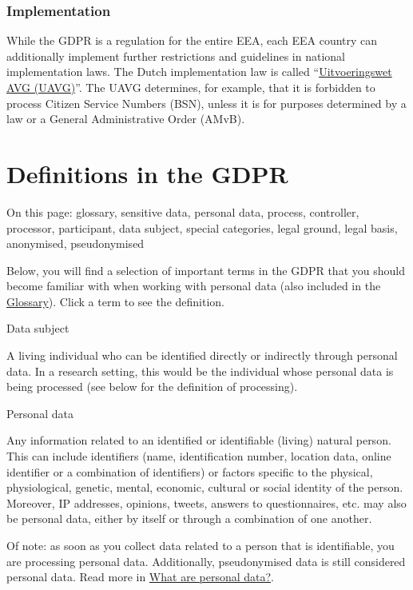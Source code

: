 \documentclass[
]{book}
\begin{document}
\hypertarget{implementation}{%
\subsubsection{Implementation}\label{implementation}}

While the GDPR is a regulation for the entire EEA, each EEA country can additionally
implement further restrictions and guidelines in national implementation laws. The
Dutch implementation law is called
``\href{https://wetten.overheid.nl/BWBR0040940/2021-07-01\%22}{Uitvoeringswet AVG (UAVG)}''.
The UAVG determines, for example, that it is forbidden to process Citizen
Service Numbers (BSN), unless it is for purposes determined by a law or a
General Administrative Order (AMvB).

\hypertarget{definitions}{%
\section{Definitions in the GDPR}\label{definitions}}

On this page: glossary, sensitive data, personal data, process, controller,
processor, participant, data subject, special categories, legal ground, legal
basis, anonymised, pseudonymised

Below, you will find a selection of important terms in the GDPR that you should
become familiar with when working with personal data (also included in the
\protect\hyperlink{glossary}{Glossary}). Click a term to see the definition.

Data subject

A living individual who can be identified directly or indirectly through
personal data. In a research setting, this would be the individual whose
personal data is being processed (see below for the definition of processing).

Personal data

Any information related to an identified or identifiable (living) natural
person. This can include identifiers (name, identification number, location
data, online identifier or a combination of identifiers) or factors specific
to the physical, physiological, genetic, mental, economic, cultural or social
identity of the person. Moreover, IP addresses, opinions, tweets, answers to
questionnaires, etc. may also be personal data, either by itself or through a
combination of one another.

Of note: as soon as you collect data related to a person that is identifiable,
you are processing personal data. Additionally, pseudonymised data is still
considered personal data. Read more in
\protect\hyperlink{personal-data}{What are personal data?}.
\end{document}
